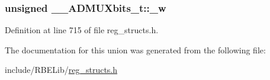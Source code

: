\hypertarget{union_____a_d_m_u_xbits__t_ad95dd7acd8493ebcad2dfa8e8a6d79b8}{
\subsubsection[{\+\_\+w}]{\setlength{\rightskip}{0pt plus 5cm}unsigned \+\_\+\+\_\+\+A\+D\+M\+U\+Xbits\+\_\+t\+::\+\_\+w}}\label{union_____a_d_m_u_xbits__t_ad95dd7acd8493ebcad2dfa8e8a6d79b8}


Definition at line 715 of file reg\+\_\+structs.\+h.



The documentation for this union was generated from the following file\+:\begin{DoxyCompactItemize}
\item 
include/\+R\+B\+E\+Lib/\hyperlink{reg__structs_8h}{reg\+\_\+structs.\+h}\end{DoxyCompactItemize}
